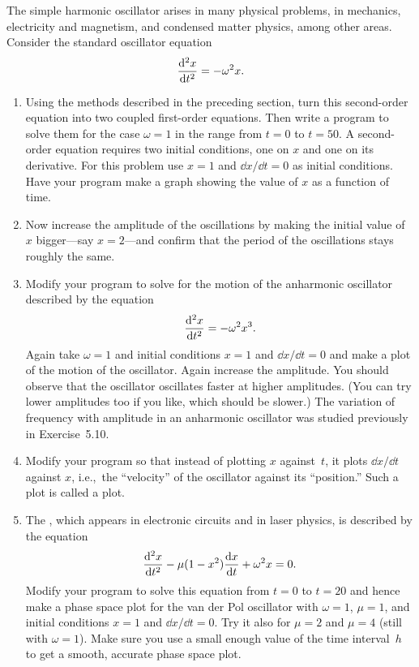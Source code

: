 \documentclass[12pt]{article}
\begin{document}
\begin{exercises}
\exskip The simple harmonic oscillator arises in many physical problems, in
mechanics, electricity and magnetism, and condensed matter physics, among
other areas.  Consider the standard oscillator equation
\begin{displaymath}
{\mathrm{d}^2 x\over\mathrm{d}t^2} = -\omega^2 x.
\end{displaymath}
\begin{enumerate}\setlength{\itemsep}{0pt}
\item Using the methods described in the preceding section, turn this
  second-order equation into two coupled first-order equations.  Then write
  a program to solve them for the case $\omega=1$ in the range from $t=0$
  to $t=50$.  A second-order equation requires two initial conditions, one
  on $x$ and one on its derivative.  For this problem use $x=1$ and $\dd
  x/\dd t = 0$ as initial conditions.  Have your program make a graph
  showing the value of $x$ as a function of time.
\item Now increase the amplitude of the oscillations by making the initial
  value of $x$ bigger---say $x=2$---and confirm that the period of the
  oscillations stays roughly the same.
\item Modify your program to solve for the motion of the anharmonic
  oscillator described by the equation
\begin{displaymath}
{\mathrm{d}^2 x\over\mathrm{d}t^2} = -\omega^2 x^3.
\end{displaymath}
Again take $\omega=1$ and initial conditions $x=1$ and $\dd x/\dd t=0$ and
make a plot of the motion of the oscillator.  Again increase the amplitude.
You should observe that the oscillator oscillates faster at higher
amplitudes.  (You can try lower amplitudes too if you like, which should be
slower.)  The variation of frequency with amplitude in an anharmonic
oscillator was studied previously in Exercise~5.10.
\item Modify your program so that instead of plotting $x$ against~$t$, it
  plots $\dd x/\dd t$ against $x$, i.e.,~the ``velocity'' of the oscillator
  against its ``position.''  Such a plot is called a  plot.
\item The , which appears in electronic
  circuits and in laser physics, is described by the equation
\begin{displaymath}
{\mathrm{d}^2 x\over\mathrm{d}t^2} - \mu (1-x^2) {\mathrm{d} x\over\mathrm{d} t} + \omega^2 x = 0.
\end{displaymath}
Modify your program to solve this equation from $t=0$ to $t=20$ and hence
make a phase space plot for the van der Pol oscillator with $\omega=1$,
$\mu=1$, and initial conditions $x=1$ and $\dd x/\dd t=0$.  Try it also for
$\mu=2$ and $\mu=4$ (still with $\omega=1$).  Make sure you use a small
enough value of the time interval~$h$ to get a smooth, accurate phase space
plot.
\end{enumerate}



\end{exercises}
\end{document}
